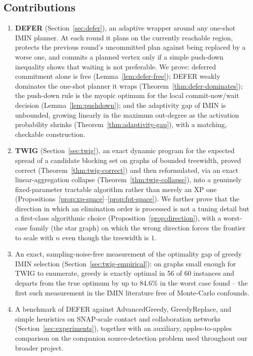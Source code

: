\documentclass[ijoc,sglanonrev]{informs4}
\begin{document}
\subsection*{Contributions}
\begin{enumerate}
\item \textbf{DEFER} (Section~\ref{sec:defer}), an adaptive wrapper around
  any one-shot IMIN planner. At each round it plans on the currently
  reachable region, protects the previous round's uncommitted plan against
  being replaced by a worse one, and commits a planned vertex only if a
  simple push-down inequality shows that waiting is not preferable. We
  prove: deferred commitment alone is free (Lemma~\ref{lem:defer-free});
  DEFER weakly dominates the one-shot planner it wraps
  (Theorem~\ref{thm:defer-dominates}); the push-down rule is the myopic
  optimum for the local commit-now/wait decision (Lemma~\ref{lem:pushdown});
  and the adaptivity gap of IMIN is unbounded, growing linearly in the
  maximum out-degree as the activation probability shrinks
  (Theorem~\ref{thm:adaptivity-gap}), with a matching, checkable
  construction.
\item \textbf{TWIG} (Section~\ref{sec:twig}), an exact dynamic program for
  the expected spread of a candidate blocking set on graphs of bounded
  treewidth, proved correct (Theorem~\ref{thm:twig-correct}) and then
  reformulated, via an exact linear-aggregation collapse
  (Theorem~\ref{thm:twig-collapse}), into a genuinely fixed-parameter
  tractable algorithm rather than merely an XP one
  (Propositions~\ref{prop:xp-space}--\ref{prop:fpt-space}). We further prove
  that the direction in which an elimination order is processed is not a
  tuning detail but a first-class algorithmic choice
  (Proposition~\ref{prop:direction}), with a worst-case family (the star
  graph) on which the wrong direction forces the frontier to scale with $n$
  even though the treewidth is $1$.
\item An exact, sampling-noise-free measurement of the optimality gap of
  greedy IMIN selection (Section~\ref{sec:twig-empirical}): on graphs small
  enough for TWIG to enumerate, greedy is exactly optimal in 56 of 60
  instances and departs from the true optimum by up to 84.6\% in the worst
  case found -- the first such measurement in the IMIN literature free of
  Monte-Carlo confounds.
\item A benchmark of DEFER against AdvancedGreedy, GreedyReplace, and
  simple heuristics on SNAP-scale contact and collaboration networks
  (Section~\ref{sec:experiments}), together with an auxiliary,
  apples-to-apples comparison on the companion source-detection problem
  used throughout our broader project.
\end{enumerate}
\end{document}
